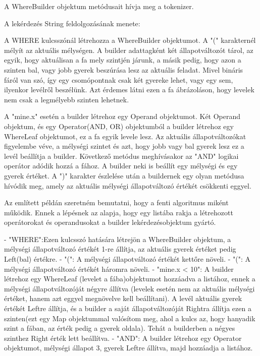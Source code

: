 A WhereBuilder objektum metódusait hívja meg a tokenizer.

A lekérdezés String feldolgozásának menete:

A WHERE kulcsszónál létrehozza a WhereBuilder objektumot. 
A "(" karakternél mélyít az aktuális mélységen. A builder adattagként két állapotváltozót tárol, az egyik, hogy aktuálisan a fa mely szintjén járunk, a másik pedig, hogy azon a szinten bal, vagy jobb gyerek beszúrása lesz az aktuális feladat. Mivel bináris fáról van szó, így egy csomópontnak csak két gyereke lehet, vagy egy sem, ilyenkor levélről beszélünk. Azt érdemes látni ezen a fa ábrázoláson, hogy levelek nem csak a legmélyebb szinten lehetnek.

A "mine.x" esetén a builder létrehoz egy Operand objektumot. Két Operand objektum, és egy Operator(AND, OR) objektumból a builder létrehoz egy WhereLeaf objektumot, ez a fa egyik levele lesz. Az aktuális állapotváltozókat figyelembe véve, a mélységi szintet és azt, hogy jobb vagy bal gyerek lesz ez a levél beállítja a builder. Következő metódus meghívásakor az "AND" logikai operátor adódik hozzá a fához. A builder neki is beállít egy mélységi és egy gyerek értéket. A ")" karakter észlelése után a buildernek egy olyan metódusa hívódik meg, amely az aktuális mélységi állapotváltozó értékét csökkenti eggyel.

Az említett példán szeretném bemutatni, hogy a fenti algoritmus miként működik. Ennek a lépésnek az alapja, hogy egy listába rakja a létrehozott operátorokat és operandusokat a builder lekérdezésobjektum gyártó.

- "WHERE":Ezen kulcsszó hatására létrejön a WhereBuilder objektum, a mélységi állapotváltozó értékét 1-re állítja, az aktuális gyerek értéket pedig Left(bal) értékre.
- "(": A mélységi állapotváltozó értékét kettőre növeli.
- "(": A mélységi állapotváltozó értékét háromra növeli.
- "mine.x < 10": A builder létrehoz egy WhereLeaf (levelet a fába)objektumot hozzáadva a listához, ennek a mélységi állapotváltozóját négyre állítva (levelek esetén nem az aktuális mélységi értéket, hanem azt eggyel megnövelve kell beállítani). A levél aktuális gyerek értékét Leftre állítja, és a builder a saját állapotváltozóját Rightra állítja ezen a szinten(ezt egy Map objektummal valósítom meg, ahol a kulcs az, hogy hanyadik szint a fában, az érték pedig a gyerek oldala). Tehát a builderben a négyes szinthez Right érték lett beállítva.
- "AND": A builder létrehoz egy Operator objektumot, mélységi állapot 3, gyerek Leftre állítva, majd hozzáadja a listához.

